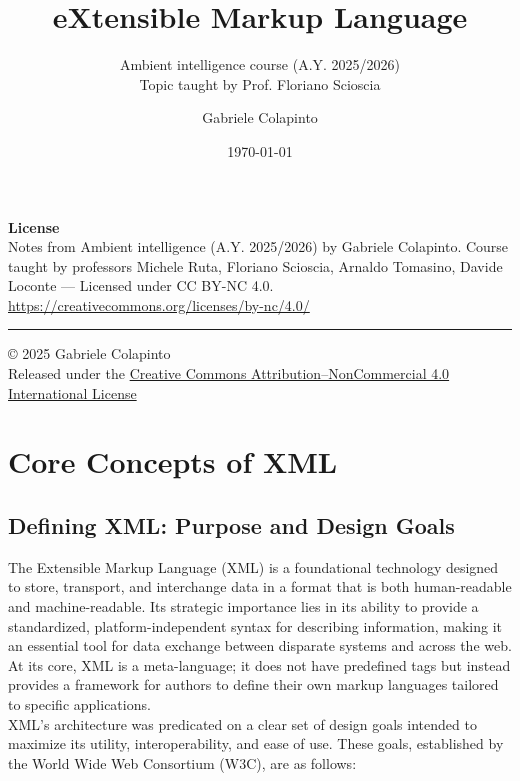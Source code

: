\documentclass{scrbook}
\title{eXtensible Markup Language}
\subtitle{Ambient intelligence course (A.Y. 2025/2026)\\Topic taught by Prof. Floriano Scioscia}
\author{Gabriele Colapinto}
\date{\today}
\begin{document}
\maketitle
\thispagestyle{empty}

{\Large\textbf{License}} \\
{Notes from Ambient intelligence (A.Y. 2025/2026) by Gabriele Colapinto. 
Course taught by professors Michele Ruta, Floriano Scioscia, Arnaldo Tomasino, Davide Loconte — 
Licensed under CC BY-NC 4.0.\\
\url{https://creativecommons.org/licenses/by-nc/4.0/}}

\vspace*{\fill}
\rule{\textwidth}{0.2pt}
\small{© 2025 Gabriele Colapinto \\
Released under the \href{https://creativecommons.org/licenses/by-nc/4.0/}{Creative Commons Attribution–NonCommercial 4.0 International License}}

\clearpage

\tableofcontents

\chapter{Core Concepts of XML}

\section{Defining XML: Purpose and Design Goals}

The Extensible Markup Language (XML) is a foundational technology designed to store, transport, and interchange data in a format that is both human-readable and machine-readable. Its strategic importance lies in its ability to provide a standardized, platform-independent syntax for describing information, making it an essential tool for data exchange between disparate systems and across the web. At its core, XML is a meta-language; it does not have predefined tags but instead provides a framework for authors to define their own markup languages tailored to specific applications. \\

XML's architecture was predicated on a clear set of design goals intended to maximize its utility, interoperability, and ease of use. These goals, established by the World Wide Web Consortium (W3C), are as follows:
\end{document}
